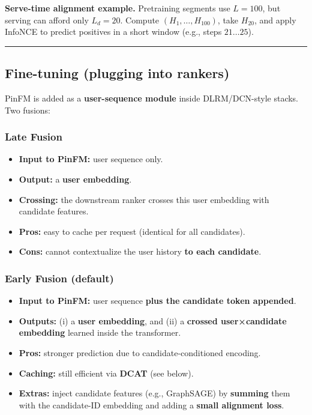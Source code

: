 \documentclass[
  letterpaper,
  DIV=11,
  numbers=noendperiod]{scrartcl}
\providecommand{\tightlist}{%
  \setlength{\itemsep}{0pt}\setlength{\parskip}{0pt}}
\begin{document}
\textbf{Serve-time alignment example.} Pretraining segments use
\(L = 100\), but serving can afford only \(L_d = 20\). Compute
\((H_1,\dots,H_{100})\), take \(H_{20}\), and apply InfoNCE to predict
positives in a short window (e.g., steps \(21\!\dots\!25\)).

\begin{center}\rule{0.5\linewidth}{0.5pt}\end{center}

\subsection{Fine-tuning (plugging into
rankers)}\label{fine-tuning-plugging-into-rankers}

PinFM is added as a \textbf{user-sequence module} inside DLRM/DCN-style
stacks. Two fusions:

\subsubsection{Late Fusion}\label{late-fusion}

\begin{itemize}
\tightlist
\item
  \textbf{Input to PinFM:} user sequence only.\\
\item
  \textbf{Output:} a \textbf{user embedding}.
\item
  \textbf{Crossing:} the downstream ranker crosses this user embedding
  with candidate features.
\item
  \textbf{Pros:} easy to cache per request (identical for all
  candidates).
\item
  \textbf{Cons:} cannot contextualize the user history \textbf{to each
  candidate}.
\end{itemize}

\subsubsection{Early Fusion (default)}\label{early-fusion-default}

\begin{itemize}
\tightlist
\item
  \textbf{Input to PinFM:} user sequence \textbf{plus the candidate
  token appended}.
\item
  \textbf{Outputs:} (i) a \textbf{user embedding}, and (ii) a
  \textbf{crossed user×candidate embedding} learned inside the
  transformer.
\item
  \textbf{Pros:} stronger prediction due to candidate-conditioned
  encoding.
\item
  \textbf{Caching:} still efficient via \textbf{DCAT} (see below).
\item
  \textbf{Extras:} inject candidate features (e.g., GraphSAGE) by
  \textbf{summing} them with the candidate-ID embedding and adding a
  \textbf{small alignment loss}.
\end{itemize}
\end{document}
